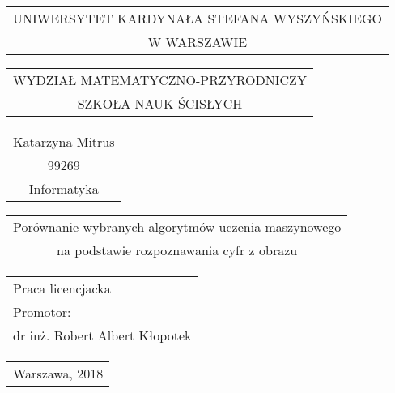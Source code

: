 \documentclass[final,a4paper,openany,12pt]{mwbk}
\begin{document}
\begin{titlepage}
\vspace{-0.5cm}

{\centering
{\footnotesize
\begin{tabular}{c}
UNIWERSYTET KARDYNAŁA STEFANA WYSZYŃSKIEGO\\
W WARSZAWIE\\
\end{tabular}
}
\vspace{2.5cm}

{\footnotesize
\begin{tabular}{c}
WYDZIAŁ MATEMATYCZNO-PRZYRODNICZY\\
SZKOŁA NAUK ŚCISŁYCH\\
\end{tabular}
}
\vspace{3.5cm}

\renewcommand{\arraystretch}{1.5} %

{\normalsize
\begin{tabular}{c}
Katarzyna Mitrus\\
99269\\
Informatyka\\
\end{tabular}
}

\vspace{1.5cm}

{\large
\begin{tabular}{c}

Porównanie wybranych algorytmów uczenia maszynowego\\
na podstawie rozpoznawania cyfr z obrazu\\

\end{tabular}
}

}

\renewcommand{\arraystretch}{1} %

\vspace{5cm}

\hspace{6cm}
\begin{tabular}{l}
Praca  licencjacka\\
Promotor:\\
dr  inż.  Robert  Albert  Kłopotek\\

\end{tabular}

\vspace{3cm}

{\centering

{\small
\begin{tabular}{c}
{Warszawa, 2018}\\
\end{tabular}
}

}
\end{titlepage}
\end{document}

